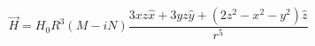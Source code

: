 \begin{equation}
    \vec{H} = H_0R^3(M-iN)\frac{3xz\hat{x}+3yz\hat{y}+(2z^2-x^2-y^2)\hat{z}}{r^5}
\label{eq:sphere_in_alternating_magnetic_field}
\end{equation}
